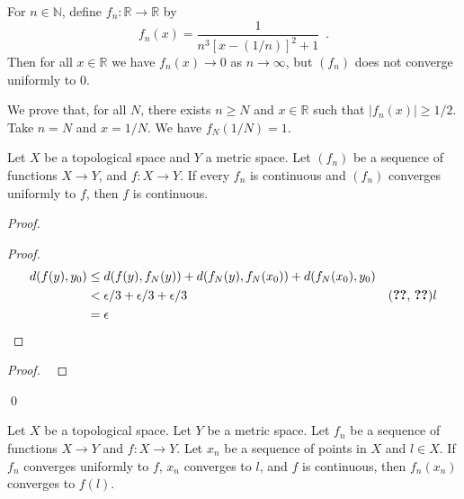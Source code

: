 \begin{ex}
For $n \in \mathbb{N}$, define $f_n : \mathbb{R} \rightarrow \mathbb{R}$ by
\[ f_n(x) = \frac{1}{n^3[x-(1/n)]^2 + 1} \enspace . \]
Then for all $x \in \mathbb{R}$ we have $f_n(x) \rightarrow 0$ as $n \rightarrow \infty$, but $(f_n)$ does not converge uniformly to 0.

We prove that, for all $N$, there exists $n \geq N$ and $x \in \mathbb{R}$ such that $|f_n(x)| \geq 1/2$. Take $n = N$ and $x = 1/N$. We have $f_N(1/N) = 1$.
\end{ex}

\begin{thm}
Let $X$ be a topological space and $Y$ a metric space. Let $(f_n)$ be a sequence of functions $X \rightarrow Y$, and $f : X \rightarrow Y$. If every $f_n$ is continuous and $(f_n)$ converges uniformly to $f$, then $f$ is continuous.
\end{thm}

\begin{proof}
\pf
{}
\begin{proof}
	\pf
	\begin{align*}
		d(f(y),y_0) & \leq d(f(y),f_N(y)) + d(f_N(y),f_N(x_0)) + d(f_N(x_0),y_0) \\
		& < \epsilon / 3 + \epsilon / 3 + \epsilon / 3 & (\text{\stepref{5}, \stepref{7}}) l\\
		& = \epsilon
	\end{align*}
\end{proof}
\begin{proof}
	\pf\ 
\end{proof}
\qed
\end{proof}

\begin{prop}
Let $X$ be a topological space. Let $Y$ be a metric space. Let $f_n$ be a sequence of functions $X \rightarrow Y$ and $f : X \rightarrow Y$. Let $x_n$ be a sequence of points in $X$ and $l \in X$. If $f_n$ converges uniformly to $f$, $x_n$ converges to $l$, and $f$ is continuous, then $f_n(x_n)$ converges to $f(l)$.
\end{prop}

